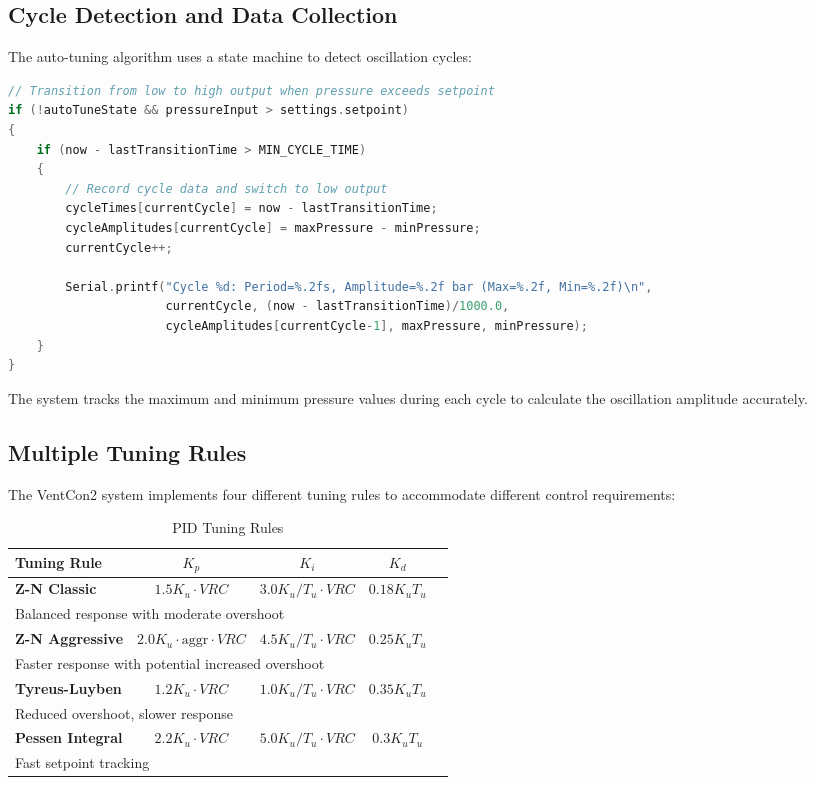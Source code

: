 \documentclass[a4paper,11pt]{article}
\begin{document}
\subsection{Cycle Detection and Data Collection}

The auto-tuning algorithm uses a state machine to detect oscillation cycles:

\begin{lstlisting}[language=C++, caption=Cycle Detection Logic]
// Transition from low to high output when pressure exceeds setpoint
if (!autoTuneState && pressureInput > settings.setpoint)
{
    if (now - lastTransitionTime > MIN_CYCLE_TIME)
    {
        // Record cycle data and switch to low output
        cycleTimes[currentCycle] = now - lastTransitionTime;
        cycleAmplitudes[currentCycle] = maxPressure - minPressure;
        currentCycle++;
        
        Serial.printf("Cycle %d: Period=%.2fs, Amplitude=%.2f bar (Max=%.2f, Min=%.2f)\n", 
                      currentCycle, (now - lastTransitionTime)/1000.0, 
                      cycleAmplitudes[currentCycle-1], maxPressure, minPressure);
    }
}
\end{lstlisting}

The system tracks the maximum and minimum pressure values during each cycle to calculate the oscillation amplitude accurately.

\subsection{Multiple Tuning Rules}

The VentCon2 system implements four different tuning rules to accommodate different control requirements\cite{wiki:pidtuning}:

\begin{table}[ht]
\centering
\caption{PID Tuning Rules\cite{ni:pidtuning}}
\begin{tabular}{lcccp{3.6cm}}
\toprule
\textbf{Tuning Rule} & \textbf{$K_p$} & \textbf{$K_i$} & \textbf{$K_d$}  \\
\midrule
\textbf{Z-N Classic} \cite{ziegler1942optimum} & $1.5K_u \cdot VRC$ & $3.0K_u/T_u \cdot VRC$ & $0.18K_uT_u$   \\
\multicolumn{4}{l}{Balanced response with moderate overshoot} \\
\textbf{Z-N Aggressive} & $2.0K_u \cdot \text{aggr} \cdot VRC$ & $4.5K_u/T_u \cdot VRC$ & $0.25K_uT_u$  \\
\multicolumn{4}{l}{Faster response with potential increased overshoot} \\
\textbf{Tyreus-Luyben} \cite{tyreus1992tuning} & $1.2K_u \cdot VRC$ & $1.0K_u/T_u \cdot VRC$ & $0.35K_uT_u$  \\
\multicolumn{4}{l}{Reduced overshoot, slower response} \\
\textbf{Pessen Integral} \cite{pessen1954new} & $2.2K_u \cdot VRC$ & $5.0K_u/T_u \cdot VRC$ & $0.3K_uT_u$  \\
\multicolumn{4}{l}{Fast setpoint tracking} \\
\bottomrule
\end{tabular}
\end{table}
\end{document}
